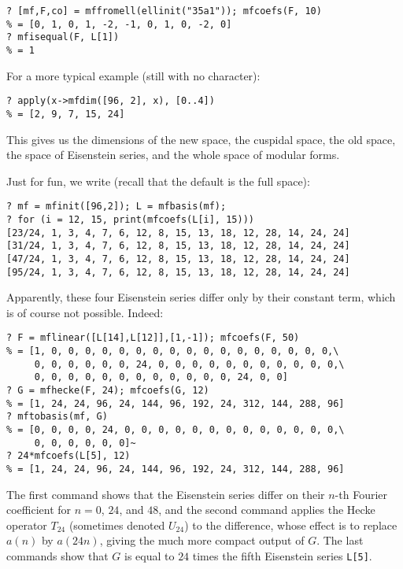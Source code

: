 \documentclass[11pt]{article}
\def\kbd#1{{\tt #1}}
\begin{document}
\begin{verbatim}
? [mf,F,co] = mffromell(ellinit("35a1")); mfcoefs(F, 10)
% = [0, 1, 0, 1, -2, -1, 0, 1, 0, -2, 0]
? mfisequal(F, L[1])
% = 1
\end{verbatim}

For a more typical example (still with no character):

\begin{verbatim}
? apply(x->mfdim([96, 2], x), [0..4])
% = [2, 9, 7, 15, 24]
\end{verbatim}

This gives us the dimensions of the new space, the cuspidal space,
the old space, the space of Eisenstein series, and the whole space of
modular forms.

Just for fun, we write (recall that the default is the full space):

\begin{verbatim}
? mf = mfinit([96,2]); L = mfbasis(mf);
? for (i = 12, 15, print(mfcoefs(L[i], 15)))
[23/24, 1, 3, 4, 7, 6, 12, 8, 15, 13, 18, 12, 28, 14, 24, 24]
[31/24, 1, 3, 4, 7, 6, 12, 8, 15, 13, 18, 12, 28, 14, 24, 24]
[47/24, 1, 3, 4, 7, 6, 12, 8, 15, 13, 18, 12, 28, 14, 24, 24]
[95/24, 1, 3, 4, 7, 6, 12, 8, 15, 13, 18, 12, 28, 14, 24, 24]
\end{verbatim}

Apparently, these four Eisenstein series differ only by their constant
term, which is of course not possible. Indeed:

\begin{verbatim}
? F = mflinear([L[14],L[12]],[1,-1]); mfcoefs(F, 50)
% = [1, 0, 0, 0, 0, 0, 0, 0, 0, 0, 0, 0, 0, 0, 0, 0, 0, 0,\
     0, 0, 0, 0, 0, 0, 24, 0, 0, 0, 0, 0, 0, 0, 0, 0, 0, 0,\
     0, 0, 0, 0, 0, 0, 0, 0, 0, 0, 0, 0, 24, 0, 0]
? G = mfhecke(F, 24); mfcoefs(G, 12)
% = [1, 24, 24, 96, 24, 144, 96, 192, 24, 312, 144, 288, 96]
? mftobasis(mf, G)
% = [0, 0, 0, 0, 24, 0, 0, 0, 0, 0, 0, 0, 0, 0, 0, 0, 0, 0,\
     0, 0, 0, 0, 0, 0]~
? 24*mfcoefs(L[5], 12)
% = [1, 24, 24, 96, 24, 144, 96, 192, 24, 312, 144, 288, 96]
\end{verbatim}

The first command shows that the Eisenstein series differ on their $n$-th
Fourier coefficient for $n=0$, $24$, and $48$, and the second command applies
the Hecke operator $T_{24}$ (sometimes denoted $U_{24}$) to the difference,
whose effect is to replace $a(n)$ by $a(24n)$, giving the much more
compact output of $G$. The last commands show that $G$ is equal to
$24$ times the fifth Eisenstein series \kbd{L[5]}.
\end{document}
